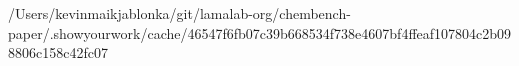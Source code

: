 /Users/kevinmaikjablonka/git/lamalab-org/chembench-paper/.showyourwork/cache/46547f6fb07c39b668534f738e4607bf4ffeaf107804c2b098806c158c42fc07